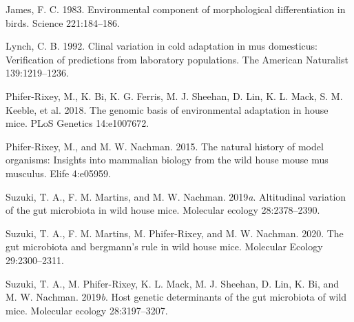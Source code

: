 \documentclass[]{article}
\begin{document}
\leavevmode\hypertarget{ref-James1983}{}%
James, F. C. 1983. Environmental component of morphological
differentiation in birds. Science 221:184--186.

\leavevmode\hypertarget{ref-Lynch1992}{}%
Lynch, C. B. 1992. Clinal variation in cold adaptation in mus
domesticus: Verification of predictions from laboratory populations. The
American Naturalist 139:1219--1236.

\leavevmode\hypertarget{ref-Phifer2018}{}%
Phifer-Rixey, M., K. Bi, K. G. Ferris, M. J. Sheehan, D. Lin, K. L.
Mack, S. M. Keeble, et al. 2018. The genomic basis of environmental
adaptation in house mice. PLoS Genetics 14:e1007672.

\leavevmode\hypertarget{ref-Phifer2015}{}%
Phifer-Rixey, M., and M. W. Nachman. 2015. The natural history of model
organisms: Insights into mammalian biology from the wild house mouse mus
musculus. Elife 4:e05959.

\leavevmode\hypertarget{ref-Suzuki2019a}{}%
Suzuki, T. A., F. M. Martins, and M. W. Nachman. 2019\emph{a}.
Altitudinal variation of the gut microbiota in wild house mice.
Molecular ecology 28:2378--2390.

\leavevmode\hypertarget{ref-Suzuki2020}{}%
Suzuki, T. A., F. M. Martins, M. Phifer-Rixey, and M. W. Nachman. 2020.
The gut microbiota and bergmann's rule in wild house mice. Molecular
Ecology 29:2300--2311.

\leavevmode\hypertarget{ref-Suzuki2019b}{}%
Suzuki, T. A., M. Phifer-Rixey, K. L. Mack, M. J. Sheehan, D. Lin, K.
Bi, and M. W. Nachman. 2019\emph{b}. Host genetic determinants of the
gut microbiota of wild mice. Molecular ecology 28:3197--3207.
\end{document}

